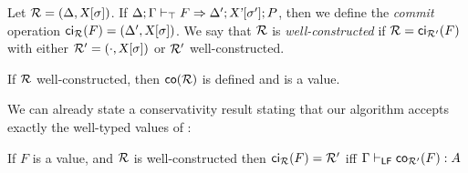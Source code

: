\documentclass{llncs}
\begin{document}


\begin{definition}
  Let $\mathcal{R} = (\Delta, {\text{\textsl{X}}}[{\sigma}])$.  If ${{\Delta}; {\Gamma}}\vdash_{\top}{{{F}}\Rightarrow{{\Delta'};{{\ensuremath{\text{\textsl{X'}}}}[{\sigma'}]};{P}}}$, then we define the
  \emph{commit} operation ${\text{\textsf{ci$_{\mathcal{R}}$}}}({F}) = (\Delta', {\text{\textsl{X}}}[{\sigma}])$. We say that $\mathcal{R}$ is \emph{well-constructed} if $\mathcal{R} =
  {\text{\textsf{ci$_{\mathcal{R'}}$}}}({F})$ with either $\mathcal{R'}=(\cdot, {\text{\textsl{X}}}[{\sigma}])$ or
  $\mathcal{R'}$ well-constructed.
\end{definition}

\begin{lemma}
  If $\mathcal{R}$ well-constructed, then ${\text{\textsf{co}}}({\mathcal{R}})$ is defined and is a
  value.
\end{lemma}

We can already state a conservativity result stating that our
algorithm accepts exactly the well-typed values of \LF:

\begin{theorem}
  If $F$ is a value, and $\mathcal{R}$ is well-constructed then ${\text{\textsf{ci$_{\mathcal{R}}$}}}({F})
  = \mathcal{R'}$ iff ${\Gamma}\vdash_{{\mathsf{LF}}}{{{\text{\textsf{co$_{\mathcal{R'}}$}}}({F})}:{A}}$
\end{theorem}
\end{document}

